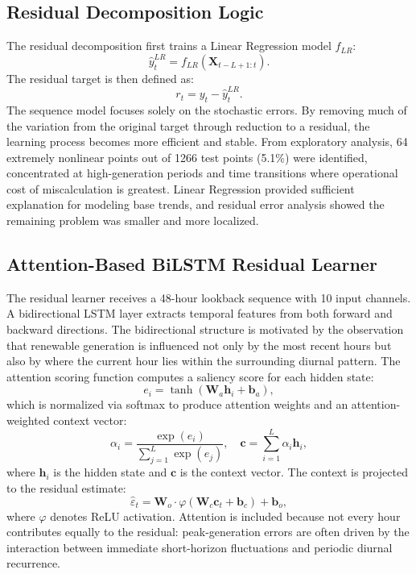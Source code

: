 \documentclass{ieeeaccess}
\begin{document}
\subsection{Residual Decomposition Logic}
The residual decomposition first trains a Linear Regression model $f_{LR}$:
\begin{equation}
\hat{y}^{LR}_t = f_{LR}(\mathbf{X}_{t-L+1:t}).
\end{equation}
The residual target is then defined as:
\begin{equation}
r_t = y_t - \hat{y}^{LR}_t.
\end{equation}
The sequence model focuses solely on the stochastic errors. By removing much of the variation from the original target through reduction to a residual, the learning process becomes more efficient and stable. From exploratory analysis, 64 extremely nonlinear points out of 1266 test points (5.1\%) were identified, concentrated at high-generation periods and time transitions where operational cost of miscalculation is greatest. Linear Regression provided sufficient explanation for modeling base trends, and residual error analysis showed the remaining problem was smaller and more localized.

\subsection{Attention-Based BiLSTM Residual Learner}
The residual learner receives a 48-hour lookback sequence with 10 input channels. A bidirectional LSTM layer extracts temporal features from both forward and backward directions. The bidirectional structure is motivated by the observation that renewable generation is influenced not only by the most recent hours but also by where the current hour lies within the surrounding diurnal pattern. The attention scoring function computes a saliency score for each hidden state:
\begin{equation}
e_i = \tanh(\mathbf{W}_a\mathbf{h}_i + \mathbf{b}_a),
\end{equation}
which is normalized via softmax to produce attention weights and an attention-weighted context vector:
\begin{equation}
\alpha_i = \frac{\exp(e_i)}{\sum_{j=1}^{L}\exp(e_j)}, \quad \mathbf{c} = \sum_{i=1}^{L}\alpha_i\mathbf{h}_i,
\end{equation}
where $\mathbf{h}_i$ is the hidden state and $\mathbf{c}$ is the context vector. The context is projected to the residual estimate:
\begin{equation}
\hat{\varepsilon}_t = \mathbf{W}_o \cdot \varphi(\mathbf{W}_c\mathbf{c}_t + \mathbf{b}_c) + \mathbf{b}_o,
\end{equation}
where $\varphi$ denotes ReLU activation. Attention is included because not every hour contributes equally to the residual: peak-generation errors are often driven by the interaction between immediate short-horizon fluctuations and periodic diurnal recurrence.
\end{document}
